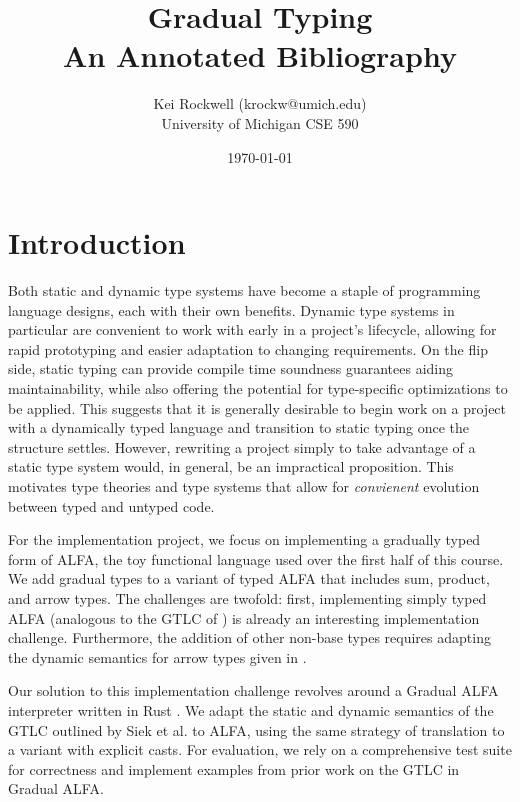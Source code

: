 \documentclass [11pt]{article}
\title{Gradual Typing\\\medskip An Annotated Bibliography}
\author{Kei Rockwell (krockw@umich.edu)\\ University of Michigan CSE 590}
\date{\today}
\begin{document}
\maketitle
\section{Introduction}
Both static and dynamic type systems have become a staple of programming language designs, each with their own benefits. Dynamic type systems in particular are convenient to work with early in a project's lifecycle, allowing for rapid prototyping and easier adaptation to changing requirements. On the flip side, static typing can provide compile time soundness guarantees aiding maintainability, while also offering the potential for type-specific optimizations to be applied. This suggests that it is generally desirable to begin work on a project with a dynamically typed language and transition to static typing once the structure settles. However, rewriting a project simply to take advantage of a static type system would, in general, be an impractical proposition. This motivates type theories and type systems that allow for \emph{convienent} evolution between typed and untyped code. 

For the implementation project, we focus on implementing a gradually typed form of ALFA, the toy functional language used over the first half of this course. We add gradual types to a variant of typed ALFA that includes sum, product, and arrow types. The challenges are twofold: first, implementing simply typed ALFA (analogous to the GTLC of \cite{siek2006gradual}) is already an interesting implementation challenge. Furthermore, the addition of other non-base types requires adapting the dynamic semantics for arrow types given in \cite{siek2015refined}.

Our solution to this implementation challenge revolves around a Gradual ALFA interpreter written in Rust \cite{Rust}. We adapt the static and dynamic semantics of the GTLC outlined by Siek et al. to ALFA, using the same strategy of translation to a variant with explicit casts. For evaluation, we rely on a comprehensive test suite for correctness and implement examples from prior work on the GTLC in Gradual ALFA.
\end{document}
